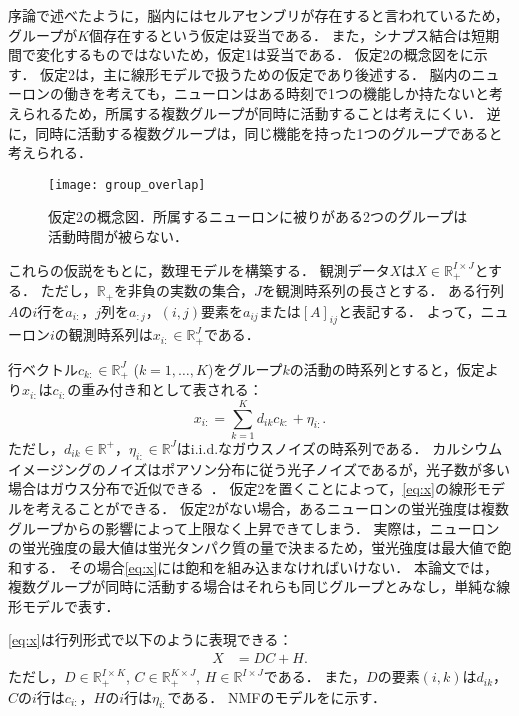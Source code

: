 序論で述べたように，脳内にはセルアセンブリが存在すると言われているため，グループが$K$個存在するという仮定は妥当である．
また，シナプス結合は短期間で変化するものではないため，仮定1は妥当である．
仮定2の概念図をに示す．
仮定2は，主に線形モデルで扱うための仮定であり後述する．
脳内のニューロンの働きを考えても，ニューロンはある時刻で1つの機能しか持たないと考えられるため，所属する複数グループが同時に活動することは考えにくい．
逆に，同時に活動する複数グループは，同じ機能を持った1つのグループであると考えられる．
\begin{figure}[htbp]
	\centering
	\texttt{[image: group\_overlap]}
	\caption{仮定2の概念図．所属するニューロンに被りがある2つのグループは活動時間が被らない．}
	\label{fig:assumption2}
\end{figure}

これらの仮説をもとに，数理モデルを構築する．
観測データ$X$は$X \in \mathbb{R}_+^{I \times J}$とする．
ただし，$\mathbb{R}_+$を非負の実数の集合，$J$を観測時系列の長さとする．
ある行列$A$の$i$行を$a_{i:}$，$j$列を$a_{:j}$，$(i,j)$要素を$a_{ij}$または$[A]_{ij}$と表記する．
よって，ニューロン$i$の観測時系列は$x_{i:} \in \mathbb{R}_+^{J}$である．

行ベクトル$c_{k:} \in \mathbb{R}^J_+$ ($k=1,\dots,K$)をグループ$k$の活動の時系列とすると，仮定より$x_{i:}$は$c_{i:}$の重み付き和として表される：
\begin{equation}
	x_{i:} = \sum_{k=1}^K d_{ik} c_{k:} + \eta_{i:}.
  \label{eq:x}
\end{equation}
ただし，$d_{ik} \in \mathbb{R}^+$，$\eta_{i:} \in \mathbb{R}^J$はi.i.d.なガウスノイズの時系列である．
カルシウムイメージングのノイズはポアソン分布に従う光子ノイズであるが，光子数が多い場合はガウス分布で近似できる~\cite{Sjulson2007}． 仮定2を置くことによって，\eqref{eq:x}の線形モデルを考えることができる．
仮定2がない場合，あるニューロンの蛍光強度は複数グループからの影響によって上限なく上昇できてしまう．
実際は，ニューロンの蛍光強度の最大値は蛍光タンパク質の量で決まるため，蛍光強度は最大値で飽和する．
その場合\eqref{eq:x}には飽和を組み込まなければいけない．
本論文では，複数グループが同時に活動する場合はそれらも同じグループとみなし，単純な線形モデルで表す．

\eqref{eq:x}は行列形式で以下のように表現できる：
\begin{align}
  X &= DC + H. \label{eq:model_matrix}
\end{align}
ただし，$D \in \mathbb{R}_+^{I \times K}$, $C \in \mathbb{R}_+^{K \times J}$, $H \in \mathbb{R}^{I \times J}$である．
また，$D$の要素$(i,k)$は$d_{ik}$，$C$の$i$行は$c_{i:}$，$H$の$i$行は$\eta_{i:}$である．
NMFのモデルをに示す．

